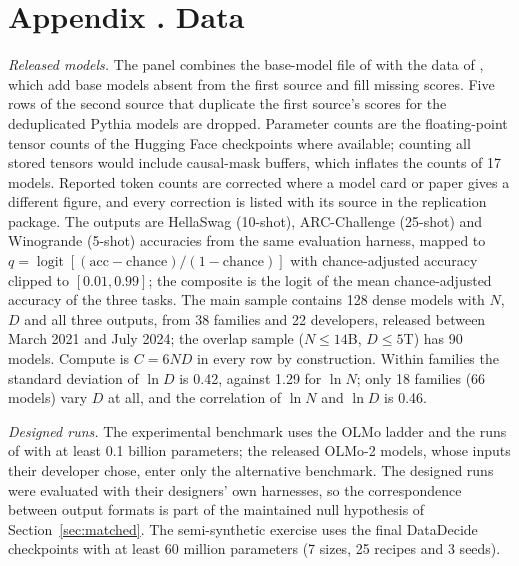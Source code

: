 \documentclass[AER,finalmode]{AEA}
\theoremstyle{definition}
\theoremstyle{remark}
\begin{document}
\section[Data]{Appendix \thesection. Data}\label{app:data}

\textit{Released models.} The panel combines the base-model file of \citet{ruan2024observational} with the data of
\citet{maiapolo2024sloth}, which add base models absent from the first source and fill missing scores. Five rows of the
second source that duplicate the first source's scores for the deduplicated Pythia models are dropped. Parameter counts
are the floating-point tensor counts of the Hugging Face checkpoints where available; counting all stored tensors would
include causal-mask buffers, which inflates the counts of 17 models. Reported token counts are corrected where a model
card or paper gives a different figure, and every correction is listed with its source in the replication package. The
outputs are HellaSwag (10-shot), ARC-Challenge (25-shot) and Winogrande (5-shot) accuracies from the same evaluation
harness, mapped to $q=\operatorname{logit}[(\text{acc}-\text{chance})/(1-\text{chance})]$ with chance-adjusted
accuracy clipped to $[0.01,0.99]$; the composite is the logit of the mean chance-adjusted accuracy of the three tasks.
The main sample contains 128 dense models with $N$, $D$ and all three outputs, from 38 families and 22 developers,
released between March 2021 and July 2024; the overlap sample ($N\le14$B, $D\le5$T) has 90 models. Compute is $C=6ND$
in every row by construction. Within families the standard deviation of $\ln D$ is 0.42, against 1.29 for $\ln N$; only
18 families (66 models) vary $D$ at all, and the correlation of $\ln N$ and $\ln D$ is 0.46.

\textit{Designed runs.} The experimental benchmark uses the OLMo ladder and the runs of \citet{gadre2024language}
with at least 0.1 billion parameters; the released OLMo-2 models, whose inputs their developer chose, enter only the
alternative benchmark. The designed runs were evaluated with their designers' own harnesses, so the correspondence
between output formats is part of the maintained null hypothesis of Section~\ref{sec:matched}. The semi-synthetic
exercise uses the final DataDecide checkpoints with at least 60 million parameters (7 sizes, 25 recipes and 3 seeds).
\end{document}
